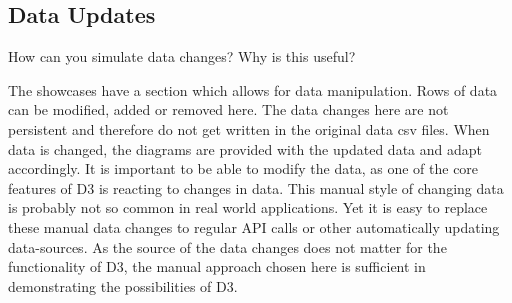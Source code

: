 \subsection{Data Updates}
How can you simulate data changes? Why is this useful?

The showcases have a section which allows for data manipulation. Rows of data can be modified, added or removed here. The data changes here are not persistent and therefore do not get written in the original data csv files. When data is changed, the diagrams are provided with the updated data and adapt accordingly. It is important to be able to modify the data, as one of the core features of D3 is reacting to changes in data. This manual style of changing data is probably not so common in real world applications. Yet it is easy to replace these manual data changes to regular API calls or other automatically updating data-sources. As the source of the data changes does not matter for the functionality of D3, the manual approach chosen here is sufficient in demonstrating the possibilities of D3.